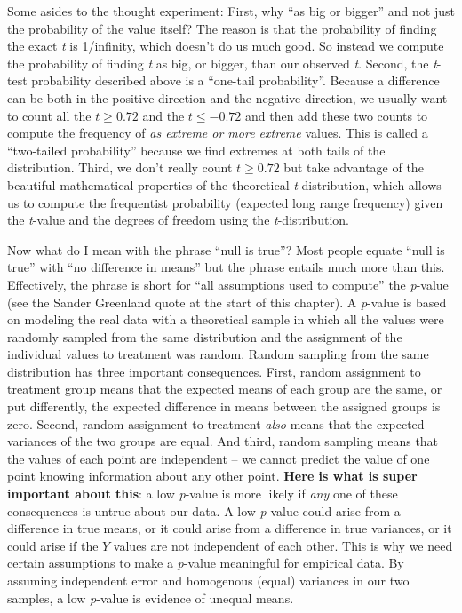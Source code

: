 \documentclass[]{book}
\begin{document}
Some asides to the thought experiment: First, why ``as big or bigger'' and not just the probability of the value itself? The reason is that the probability of finding the exact \emph{t} is 1/infinity, which doesn't do us much good. So instead we compute the probability of finding \emph{t} as big, or bigger, than our observed \emph{t}. Second, the \emph{t}-test probability described above is a ``one-tail probability''. Because a difference can be both in the positive direction and the negative direction, we usually want to count all the \(t \ge 0.72\) and the \(t \le -0.72\) and then add these two counts to compute the frequency of \emph{as extreme or more extreme} values. This is called a ``two-tailed probability'' because we find extremes at both tails of the distribution. Third, we don't really count \(t \ge 0.72\) but take advantage of the beautiful mathematical properties of the theoretical \emph{t} distribution, which allows us to compute the frequentist probability (expected long range frequency) given the \emph{t}-value and the degrees of freedom using the \emph{t}-distribution.

Now what do I mean with the phrase ``null is true''? Most people equate ``null is true'' with ``no difference in means'' but the phrase entails much more than this. Effectively, the phrase is short for ``all assumptions used to compute'' the \emph{p}-value (see the Sander Greenland quote at the start of this chapter). A \emph{p}-value is based on modeling the real data with a theoretical sample in which all the values were randomly sampled from the same distribution and the assignment of the individual values to treatment was random. Random sampling from the same distribution has three important consequences. First, random assignment to treatment group means that the expected means of each group are the same, or put differently, the expected difference in means between the assigned groups is zero. Second, random assignment to treatment \emph{also} means that the expected variances of the two groups are equal. And third, random sampling means that the values of each point are independent -- we cannot predict the value of one point knowing information about any other point. \textbf{Here is what is super important about this}: a low \emph{p}-value is more likely if \emph{any} one of these consequences is untrue about our data. A low \emph{p}-value could arise from a difference in true means, or it could arise from a difference in true variances, or it could arise if the \(Y\) values are not independent of each other. This is why we need certain assumptions to make a \emph{p}-value meaningful for empirical data. By assuming independent error and homogenous (equal) variances in our two samples, a low \emph{p}-value is evidence of unequal means.
\end{document}
